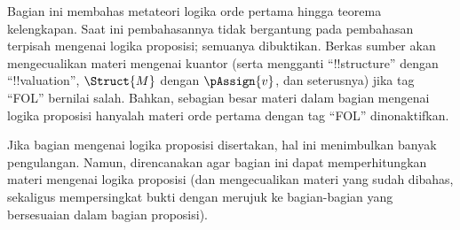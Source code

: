 \documentclass[../../include/open-logic-part]{subfiles}
\begin{document}

\begin{editorial}
  Bagian ini membahas metateori logika orde pertama hingga teorema
  kelengkapan. Saat ini pembahasannya tidak bergantung pada pembahasan
  terpisah mengenai logika proposisi; semuanya dibuktikan. Berkas sumber akan
  mengecualikan materi mengenai kuantor (serta mengganti ``!!{structure}''
  dengan ``!!{valuation}'', $\Struct{M}$ dengan $\pAssign{v}$, dan
  seterusnya) jika tag ``FOL'' bernilai salah. Bahkan, sebagian besar materi
  dalam bagian mengenai logika proposisi hanyalah materi orde pertama dengan
  tag ``FOL'' dinonaktifkan.

  Jika bagian mengenai logika proposisi disertakan, hal ini menimbulkan
  banyak pengulangan. Namun, direncanakan agar bagian ini dapat memperhitungkan
  materi mengenai logika proposisi (dan mengecualikan materi yang sudah
  dibahas, sekaligus mempersingkat bukti dengan merujuk ke bagian-bagian yang
  bersesuaian dalam bagian proposisi).
\end{editorial}












\OLEndPartHook
\end{document}
